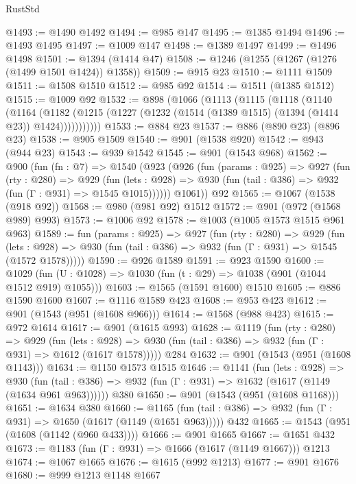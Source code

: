 \begin{lexlean}{RustStd}
\begin{coremodule}
{\begin{coremodule}
{{{{{{{{{{{{{{@1493 := @1490 @1492
@1494 := @985 @147
@1495 := @1385 @1494
@1496 := @1493 @1495
@1497 := @1009 @147
@1498 := @1389 @1497
@1499 := @1496 @1498
@1501 := @1394 (@1414 @47)
@1508 := @1246 (@1255 (@1267 (@1276 (@1499 @1501 @1424)) @1358))
@1509 := @915 @23
@1510 := @1111 @1509
@1511 := @1508 @1510
@1512 := @985 @92
@1514 := @1511 (@1385 @1512)
@1515 := @1009 @92
@1532 := @898
    (@1066
      (@1113
        (@1115
          (@1118
            (@1140
              (@1164
                (@1182
                  (@1215 (@1227 (@1232 (@1514 (@1389 @1515) (@1394 (@1414 @23)) @1424)))))))))))
@1533 := @884 @23
@1537 := @886 (@890 @23) (@896 @23)
@1538 := @905 @1509
@1540 := @901 (@1538 @920)
@1542 := @943 (@944 @23)
@1543 := @939 @1542
@1545 := @901 (@1543 @968)
@1562 := @900
    (fun (fn : @7) =>
    @1540
      (@923
        (@926
          (fun (params : @925) =>
          @927
            (fun (rty : @280) =>
            @929
              (fun (lets : @928) =>
              @930 (fun (tail : @386) => @932 (fun (Γ : @931) => @1545 @1015))))))
        @1061))
    @92
@1565 := @1067 (@1538 (@918 @92))
@1568 := @980 (@981 @92) @1512
@1572 := @901 (@972 (@1568 @989) @993)
@1573 := @1006 @92
@1578 := @1003 (@1005 @1573 @1515 @961 @963)
@1589 := fun (params : @925) =>
  @927
    (fun (rty : @280) =>
    @929
      (fun (lets : @928) =>
      @930 (fun (tail : @386) => @932 (fun (Γ : @931) => @1545 (@1572 @1578)))))
@1590 := @926 @1589
@1591 := @923 @1590
@1600 := @1029 (fun (U : @1028) => @1030 (fun (t : @29) => @1038 (@901 (@1044 @1512 @919) @1055)))
@1603 := @1565 (@1591 @1600) @1510
@1605 := @886 @1590 @1600
@1607 := @1116 @1589 @423
@1608 := @953 @423
@1612 := @901 (@1543 (@951 (@1608 @966)))
@1614 := @1568 (@988 @423)
@1615 := @972 @1614
@1617 := @901 (@1615 @993)
@1628 := @1119
    (fun (rty : @280) =>
    @929
      (fun (lets : @928) =>
      @930 (fun (tail : @386) => @932 (fun (Γ : @931) => @1612 (@1617 @1578)))))
    @284
@1632 := @901 (@1543 (@951 (@1608 @1143)))
@1634 := @1150 @1573 @1515
@1646 := @1141
    (fun (lets : @928) =>
    @930 (fun (tail : @386) => @932 (fun (Γ : @931) => @1632 (@1617 (@1149 (@1634 @961 @963))))))
    @380
@1650 := @901 (@1543 (@951 (@1608 @1168)))
@1651 := @1634 @380
@1660 := @1165
    (fun (tail : @386) => @932 (fun (Γ : @931) => @1650 (@1617 (@1149 (@1651 @963)))))
    @432
@1665 := @1543 (@951 (@1608 (@1142 (@960 @433))))
@1666 := @901 @1665
@1667 := @1651 @432
@1673 := @1183 (fun (Γ : @931) => @1666 (@1617 (@1149 @1667))) @1213
@1674 := @1067 @1665
@1676 := @1615 (@992 @1213)
@1677 := @901 @1676
@1680 := @999 @1213 @1148 @1667
}}}}}}}}}}}}}}
\end{coremodule}}
\end{coremodule}
\end{lexlean}
